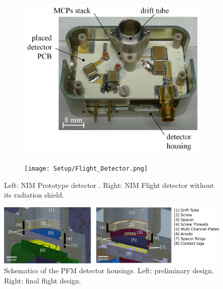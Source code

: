 		\begin{figure}[h] %
			\begin{subfigure}{0.5\textwidth}
				\centering
				\includegraphics[width=\textwidth]{Setup/Prototype_Detector.png}
			\end{subfigure}
			\begin{subfigure}{0.5\textwidth}
				\centering
				\texttt{[image: Setup/Flight\_Detector.png]}
			\end{subfigure}
			\caption{Left: NIM Prototype detector \cite{Diss_Meyer}. Right: NIM Flight detector without its radiation shield.}
			\label{fig:DetPhotos}
		\end{figure}
		\begin{figure}[h] %
			\centering
			\includegraphics[width= \textwidth]{Setup/PFMDetectors.png}
			\caption{Schematics of the PFM detector housings. Left: preliminary design. Right: final flight design.}
			\label{fig:FlightDetSchemata}
		\end{figure}
